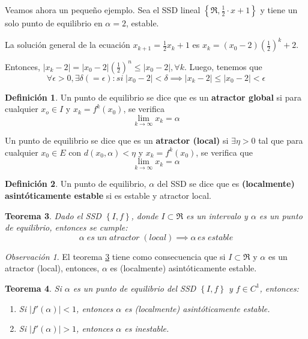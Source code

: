 \documentclass[a4paper, 12pt]{article}
\theoremstyle{plain}
\newtheorem{teorema}{Teorema}[section]
\theoremstyle{definition}
\newtheorem{definicion}[teorema]{Definición}
\theoremstyle{remark}
\newtheorem*{observacion}{Observación}
\begin{document}
	\textcolor{Azul}{
	Veamos ahora un pequeño ejemplo. Sea el SSD lineal $\left\{\Re, \frac{1}{2}\cdot x+1\right\}$ y tiene un solo punto de equilibrio en $\alpha=2$, estable.
	}

	\smallskip
	\textcolor{Azul}{
	La solución general de la ecuación $x_{k+1} = \frac{1}{2}x_k+1$ es $x_k=(x_0-2)(\frac{1}{2})^k+2$.
	}
	
	\smallskip
	\textcolor{Azul}{
	Entonces, $|x_k-2| = |x_0-2|(\frac{1}{2})^n \leq |x_0-2|, \forall k $. Luego, tenemos que \[\forall \epsilon>0, \exists \delta(=\epsilon): si\; |x_0-2|<\delta \implies |x_k-2|\leq |x_0-2|<\epsilon\]
	}
	
	\medskip
	\begin{definicion}\label{Atractor}
		Un punto de equilibrio se dice que es un \textbf{atractor global} si para cualquier $x_o \in I$ y $x_k=f^k(x_0)$, se verifica \[\lim_{k\rightarrow\infty}x_k=\alpha\]
		
		Un punto de equilibrio se dice que es un \textbf{atractor (local)} si $\exists \eta>0$ tal que para cualquier $x_0 \in E$ con $d(x_0,\alpha)<\eta$ y $x_k=f^k(x_0)$, se verifica que \[\lim_{k\rightarrow\infty}x_k=\alpha\]
	\end{definicion}

	\begin{definicion}
		Un punto de equilibrio, $\alpha$ del SSD se dice que es \textbf{(localmente) asintóticamente estable} si es estable y atractor local.
	\end{definicion}

	\begin{teorema}\label{Teo1}
		Dado el SSD \(\left\{I,f \right\}\), donde $I\subset \Re$ es un intervalo y $\alpha$ es un punto de equilibrio, entonces se cumple:\[\alpha\;es\;un\;atractor\;(local)\implies\alpha\,es\;estable\]
	\end{teorema}

	\begin{observacion}
		El teorema \ref{Teo1} tiene como consecuencia que si $I\subset\Re$ y $\alpha$ es un atractor (local), entonces, $\alpha$ es (localmente) asintóticamente estable.
	\end{observacion}

	\begin{teorema}\label{Teo2}
		Si $\alpha$ es un punto de equilibrio del SSD \(\left\{I,f \right\}\) y $f\in C^1$, entonces:
		\begin{enumerate}
			\item Si $|f'(\alpha)|<1$, entonces $\alpha$ es (localmente) asintóticamente estable.
			\item Si $|f'(\alpha)|>1$, entonces $\alpha$ es inestable.
		\end{enumerate}
	\end{teorema}
\end{document}
